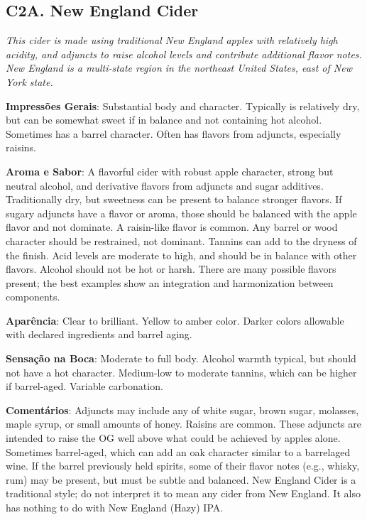 \subsection*{C2A. New England Cider}

\textit{This cider is made using traditional New England apples with relatively high acidity, and adjuncts to raise alcohol levels and contribute additional flavor notes. New England is a multi-state region in the northeast United States, east of New York state.}

\textbf{Impressões Gerais}: Substantial body and character. Typically is relatively dry, but can be somewhat sweet if in balance and not containing hot alcohol. Sometimes has a barrel character. Often has flavors from adjuncts, especially raisins.

\textbf{Aroma e Sabor}: A flavorful cider with robust apple character, strong but neutral alcohol, and derivative flavors from adjuncts and sugar additives. Traditionally dry, but sweetness can be present to balance stronger flavors. If sugary adjuncts have a flavor or aroma, those should be balanced with the apple flavor and not dominate. A raisin-like flavor is common. Any barrel or wood character should be restrained, not dominant. Tannins can add to the dryness of the finish. Acid levels are moderate to high, and should be in balance with other flavors. Alcohol should not be hot or harsh. There are many possible flavors present; the best examples show an integration and harmonization between components.

\textbf{Aparência}: Clear to brilliant. Yellow to amber color. Darker colors allowable with declared ingredients and barrel aging.

\textbf{Sensação na Boca}: Moderate to full body. Alcohol warmth typical, but should not have a hot character. Medium-low to moderate tannins, which can be higher if barrel-aged. Variable carbonation.

\textbf{Comentários}: Adjuncts may include any of white sugar, brown sugar, molasses, maple syrup, or small amounts of honey. Raisins are common. These adjuncts are intended to raise the OG well above what could be achieved by apples alone. Sometimes barrel-aged, which can add an oak character similar to a barrelaged wine. If the barrel previously held spirits, some of their flavor notes (e.g., whisky, rum) may be present, but must be subtle and balanced. New England Cider is a traditional style; do not interpret it to mean any cider from New England. It also has nothing to do with New England (Hazy) IPA.

